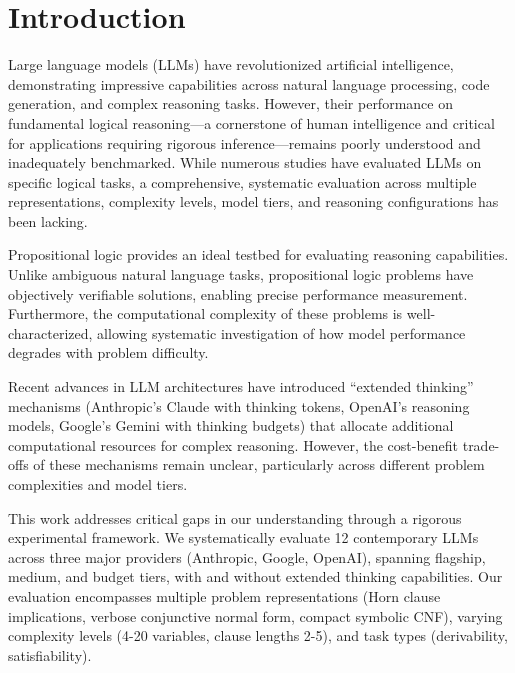 \documentclass[pdflatex,sn-mathphys-num]{sn-jnl}%
\theoremstyle{thmstyleone}%
\theoremstyle{thmstyletwo}%
\theoremstyle{thmstylethree}%
\begin{document}
\maketitle

\section{Introduction}\label{sec1}

Large language models (LLMs) have revolutionized artificial intelligence, demonstrating impressive capabilities across natural language processing, code generation, and complex reasoning tasks. However, their performance on fundamental logical reasoning—a cornerstone of human intelligence and critical for applications requiring rigorous inference—remains poorly understood and inadequately benchmarked. While numerous studies have evaluated LLMs on specific logical tasks, a comprehensive, systematic evaluation across multiple representations, complexity levels, model tiers, and reasoning configurations has been lacking.

Propositional logic provides an ideal testbed for evaluating reasoning capabilities. Unlike ambiguous natural language tasks, propositional logic problems have objectively verifiable solutions, enabling precise performance measurement. Furthermore, the computational complexity of these problems is well-characterized, allowing systematic investigation of how model performance degrades with problem difficulty.

Recent advances in LLM architectures have introduced ``extended thinking'' mechanisms (Anthropic's Claude with thinking tokens, OpenAI's reasoning models, Google's Gemini with thinking budgets) that allocate additional computational resources for complex reasoning. However, the cost-benefit trade-offs of these mechanisms remain unclear, particularly across different problem complexities and model tiers.

This work addresses critical gaps in our understanding through a rigorous experimental framework. We systematically evaluate 12 contemporary LLMs across three major providers (Anthropic, Google, OpenAI), spanning flagship, medium, and budget tiers, with and without extended thinking capabilities. Our evaluation encompasses multiple problem representations (Horn clause implications, verbose conjunctive normal form, compact symbolic CNF), varying complexity levels (4-20 variables, clause lengths 2-5), and task types (derivability, satisfiability).
\end{document}
